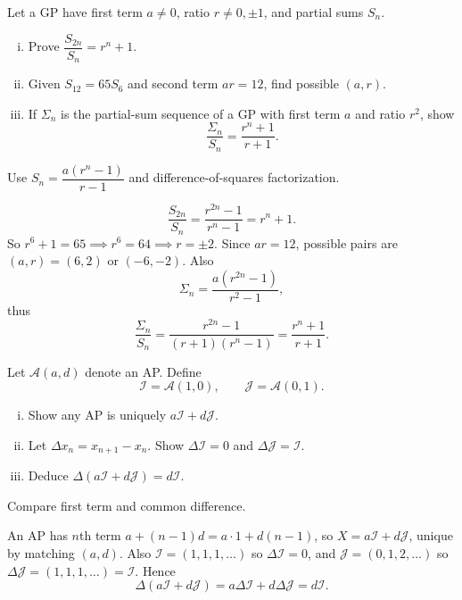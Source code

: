 \begin{problem}
Let a GP have first term $a\neq0$, ratio $r\neq 0,\pm1$, and partial sums $S_n$.
\begin{enumerate}[(i)]
\item Prove $\dfrac{S_{2n}}{S_n}=r^n+1$.
\item Given $S_{12}=65S_6$ and second term $ar=12$, find possible $(a,r)$.
\item If $\Sigma_n$ is the partial-sum sequence of a GP with first term $a$ and ratio $r^2$, show
\[
\frac{\Sigma_n}{S_n}=\frac{r^n+1}{r+1}.
\]
\end{enumerate}
\end{problem}
\begin{hint}
Use $S_n=\dfrac{a(r^n-1)}{r-1}$ and difference-of-squares factorization.
\end{hint}
\begin{solution}
\[
\frac{S_{2n}}{S_n}=\frac{r^{2n}-1}{r^n-1}=r^n+1.
\]
So $r^6+1=65\implies r^6=64\implies r=\pm2$.
Since $ar=12$, possible pairs are $(a,r)=(6,2)$ or $(-6,-2)$.
Also
\[
\Sigma_n=\frac{a(r^{2n}-1)}{r^2-1},
\]
thus
\[
\frac{\Sigma_n}{S_n}
=\frac{r^{2n}-1}{(r+1)(r^n-1)}
=\frac{r^n+1}{r+1}.
\]
\end{solution}

\begin{problem}
Let $\mathcal{A}(a,d)$ denote an AP. Define
\[
\mathcal{I}=\mathcal{A}(1,0),\qquad \mathcal{J}=\mathcal{A}(0,1).
\]
\begin{enumerate}[(i)]
\item Show any AP is uniquely $a\mathcal{I}+d\mathcal{J}$.
\item Let $\Delta x_n=x_{n+1}-x_n$. Show $\Delta\mathcal{I}=0$ and $\Delta\mathcal{J}=\mathcal{I}$.
\item Deduce $\Delta(a\mathcal{I}+d\mathcal{J})=d\mathcal{I}$.
\end{enumerate}
\end{problem}
\begin{hint}
Compare first term and common difference.
\end{hint}
\begin{solution}
An AP has $n$th term $a+(n-1)d=a\cdot1+d(n-1)$, so $X=a\mathcal{I}+d\mathcal{J}$, unique by matching $(a,d)$.
Also $\mathcal{I}=(1,1,1,\dots)$ so $\Delta\mathcal{I}=0$, and $\mathcal{J}=(0,1,2,\dots)$ so $\Delta\mathcal{J}=(1,1,1,\dots)=\mathcal{I}$.
Hence
\[
\Delta(a\mathcal{I}+d\mathcal{J})=a\Delta\mathcal{I}+d\Delta\mathcal{J}=d\mathcal{I}.
\]
\end{solution}

